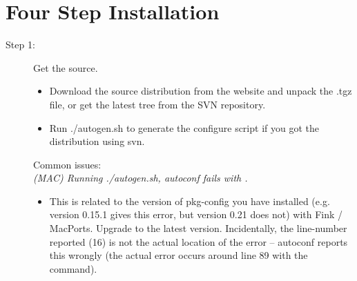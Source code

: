 \section{Four Step Installation}

\begin{description}
	\item[Step 1:\its] Get the source.
	\begin{itemize}
		\item Download the source distribution from the website and unpack the .tgz file, or get the latest tree from the SVN repository.
		\item Run {\sffamily ./autogen.sh} to generate the {\sffamily configure} script if you got the distribution using svn.
	\end{itemize}
	Common issues:\\
	\emph{(MAC) Running {\sffamily ./autogen.sh}, autoconf fails with .}
	\begin{itemize}
		\item This is related to the version of pkg-config you have installed (e.g. version 0.15.1 gives this error, but version 0.21 does not) with Fink / MacPorts. Upgrade to the latest version. Incidentally, the line-number reported (16) is not the actual location of the error -- autoconf reports this wrongly (the actual error occurs around line 89 with the \qte{PKG\_CHECK\_MODULES(GTK28, ..., [AC\_DEFINE...} command).
	\end{itemize}
\end{description}

